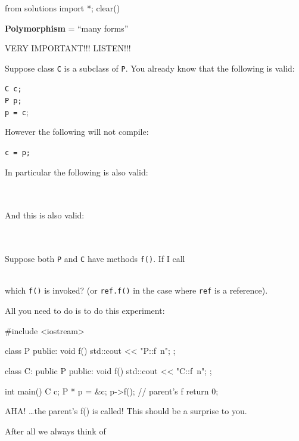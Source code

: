 \begin{python0}
from solutions import *; clear()
\end{python0}

\textbf{Polymorphism} = ``many forms''

VERY IMPORTANT!!! LISTEN!!!

Suppose class \texttt{C} is a subclass of \texttt{P}. You already know that
the following is valid:
\begin{center}
\verb!C c;!\\
\verb!P p;!\\
\verb!p = c!;\\
\end{center}
However the following will not compile:
\begin{center}
\texttt{c = p;}
\end{center}
In particular the following is also valid:

\\
\\

And this is also valid:

\\
\\

Suppose both \texttt{P} and \texttt{C} have methods \texttt{f()}. If I call

\\

which \texttt{f()} is invoked? (or \texttt{ref.f()} in the case where
\texttt{ref} is a reference).

All you need to do is to do this experiment:

\begin{console}
#include <iostream>

class P
{   
public:
     void f()
     {    
          std::cout << "P::f\ n";
     }
};

class C: public P
{
public:
     void f()
     {    
          std::cout << "C::f\ n";
     }
};

int main()
{   
    C c;
    P * p = &c;
    p->f(); // parent's f
    return 0;
}
\end{console}

AHA! \ldots the parent's f() is called! This should be a surprise to you.

After all we always think of

